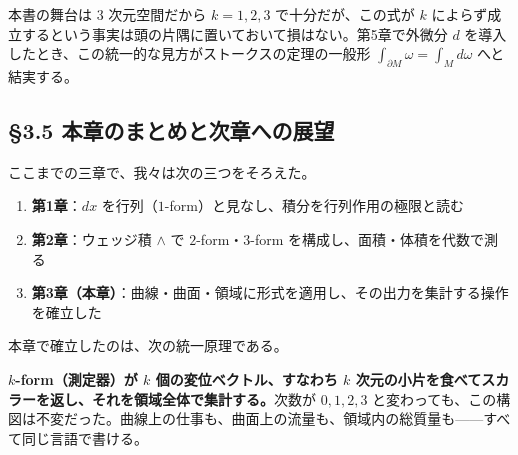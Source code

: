 \documentclass[a4paper,12pt,openany]{book}
\providecommand{\tightlist}{%
  \setlength{\itemsep}{0pt}\setlength{\parskip}{0pt}}
\begin{document}
本書の舞台は 3 次元空間だから \(k=1,2,3\) で十分だが、この式が \(k\)
によらず成立するという事実は頭の片隅に置いておいて損はない。第5章で外微分
\(d\) を導入したとき、この統一的な見方がストークスの定理の一般形
\(\int_{\partial M} \omega = \int_M d\omega\) へと結実する。

\par\vspace{0.35em}\par

\hypertarget{ux672cux7ae0ux306eux307eux3068ux3081ux3068ux6b21ux7ae0ux3078ux306eux5c55ux671b-1}{%
\subsection{§3.5
本章のまとめと次章への展望}\label{ux672cux7ae0ux306eux307eux3068ux3081ux3068ux6b21ux7ae0ux3078ux306eux5c55ux671b-1}}

ここまでの三章で、我々は次の三つをそろえた。

\begin{enumerate}
\def\labelenumi{\arabic{enumi}.}
\tightlist
\item
  \textbf{第1章}：\(dx\)
  を行列（\(1\)-form）と見なし、積分を行列作用の極限と読む
\item
  \textbf{第2章}：ウェッジ積 \(\wedge\) で \(2\)-form・\(3\)-form
  を構成し、面積・体積を代数で測る
\item
  \textbf{第3章（本章）}：曲線・曲面・領域に形式を適用し、その出力を集計する操作を確立した
\end{enumerate}

本章で確立したのは、次の統一原理である。

\textbf{$k$-form（測定器）が $k$ 個の変位ベクトル、すなわち $k$ 次元の小片を食べてスカラーを返し、それを領域全体で集計する。}次数が
\(0,1,2,3\)
と変わっても、この構図は不変だった。曲線上の仕事も、曲面上の流量も、領域内の総質量も——すべて同じ言語で書ける。
\end{document}

